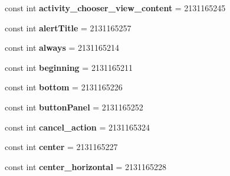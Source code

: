 \begin{DoxyCompactItemize}
const int {\bfseries activity\+\_\+chooser\+\_\+view\+\_\+content} = 2131165245
\item 
\mbox{\label{class_pinned_app_1_1_droid_1_1_resource_1_1_id_af7d40e3baec3dc6af6f592814307fb8a}} 
const int {\bfseries alert\+Title} = 2131165257
\item 
\mbox{\label{class_pinned_app_1_1_droid_1_1_resource_1_1_id_a6b26c1d6d8183d82929fe5a682ad2997}} 
const int {\bfseries always} = 2131165214
\item 
\mbox{\label{class_pinned_app_1_1_droid_1_1_resource_1_1_id_aff8a040fa79ef389e30bfb332c9cbf8e}} 
const int {\bfseries beginning} = 2131165211
\item 
\mbox{\label{class_pinned_app_1_1_droid_1_1_resource_1_1_id_a53a0603274c9bd644c1f87bf70b6364b}} 
const int {\bfseries bottom} = 2131165226
\item 
\mbox{\label{class_pinned_app_1_1_droid_1_1_resource_1_1_id_ae8000b62f63c0e654e33b305dd53ce47}} 
const int {\bfseries button\+Panel} = 2131165252
\item 
\mbox{\label{class_pinned_app_1_1_droid_1_1_resource_1_1_id_aa811ee426853e982de076fcec44aab18}} 
const int {\bfseries cancel\+\_\+action} = 2131165324
\item 
\mbox{\label{class_pinned_app_1_1_droid_1_1_resource_1_1_id_a9da2b53bed5041900dc96b7b0df4ab9d}} 
const int {\bfseries center} = 2131165227
\item 
\mbox{\label{class_pinned_app_1_1_droid_1_1_resource_1_1_id_a32cf29f127522432d9a0495eaa7222a6}} 
const int {\bfseries center\+\_\+horizontal} = 2131165228
\item 
\mbox{\label{class_pinned_app_1_1_droid_1_1_resource_1_1_id_a6fd38caa4f1e8d49e28231da7f13f3e2}} 

\end{DoxyCompactItemize}
